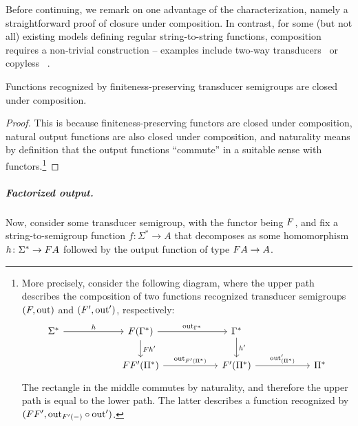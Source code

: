 Before continuing, we remark on one advantage of the characterization, namely a
straightforward proof of closure under composition. In contrast, for some (but
not all) existing models defining regular string-to-string functions,
composition requires a non-trivial construction -- examples include two-way
transducers~\cite[Theorem 2]{ChytilJ77} or copyless \sst~\cite[Theorem
1]{composingSST}.
\begin{proposition}\label{prop:composition}
  Functions recognized by finiteness-preserving transducer semigroups are closed
  under composition.
\end{proposition}
\begin{proof}
  This is because finiteness-preserving functors are closed under composition,
  natural output functions are also closed under composition, and naturality
  means by definition that the output functions \enquote{commute} in a suitable
  sense with functors.\footnote{More precisely, consider the following diagram,
    where the upper path describes the composition of two functions recognized
    transducer semigroups $(\functor,\outfun)$ and $(\functor',\outfun')$,
    respectively:
    \[
      \begin{tikzcd}[ampersand replacement=\&, column sep=2cm]
        \Sigma^* 
        \ar[r,"h"]
        \& 
        \functor(\Gamma^*)
        \ar[r,"\outfun_{\Gamma^*}"]
        \ar[d,"\functor h'"]
        \&
        \Gamma^* \ar[d,"h'"]\\
        \&
        \functor\functor'(\Pi^*) \ar[r,"\outfun_{\functor'(\Pi^*)}"]
        \& 
        \functor'(\Pi^*)
        \ar[r,"\outfun'_{(\Pi^*)}"]
        \&
        \Pi^*
      \end{tikzcd}
    \]
    The rectangle in the middle commutes by naturality, and therefore the upper path is equal to the lower path. The latter describes a function recognized by $(\functor\functor', \outfun_{\functor'(-)} \circ \outfun')$.}
\end{proof}



 




\subparagraph{Factorized output.}
Now, consider some transducer semigroup, with the functor being $\functor$, and fix a string-to-semigroup function $f\colon \Sigma^* \to A$ that decomposes as some homomorphism $h\colon \Sigma^* \to \functor A$ followed by the output function of type $\functor A \to A$. 

